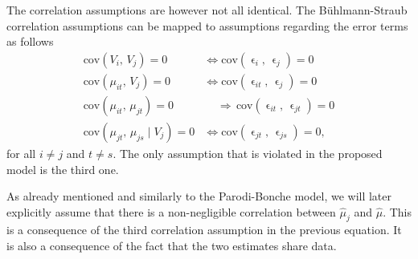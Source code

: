 \documentclass[11pt]{article}
\theoremstyle{definition}
\begin{document}
The correlation assumptions are however not all identical. The Bühlmann-Straub correlation assumptions can be mapped to assumptions regarding the error terms as follows
\begin{equation*}
    \begin{aligned}
        \text{cov}(V_i,\, V_j) = 0 &\iff \text{cov}(\upvarepsilon_i,\, \upvarepsilon_j)=0 \\
        \text{cov}(\mu_{it},\, V_j) = 0 &\iff \text{cov}(\upvarepsilon_{it},\, \upvarepsilon_j)=0 \\
        \text{cov}(\mu_{it},\, \mu_{jt}) = 0 & \quad\, \Rightarrow \, \text{cov}(\upvarepsilon_{it},\, \upvarepsilon_{jt}) = 0 \\
        \text{cov}(\mu_{jt},\, \mu_{js} \mid V_j) = 0 &\iff \text{cov}(\upvarepsilon_{jt},\, \upvarepsilon_{js}) = 0,
    \end{aligned}
\end{equation*}
for all $i\neq j$ and $t \neq s$. The only assumption that is violated in the proposed model is the third one.

As already mentioned and similarly to the Parodi-Bonche model, we will later explicitly assume that there is a non-negligible correlation between $\hat\mu_j$ and $\hat\mu$. This is a consequence of the third correlation assumption in the previous equation. It is also a consequence of the fact that the two estimates share data.
\end{document}
